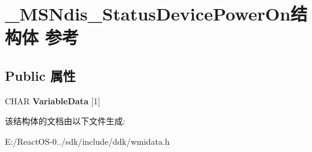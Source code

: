 \hypertarget{struct___m_s_ndis___status_device_power_on}{}\section{\+\_\+\+M\+S\+Ndis\+\_\+\+Status\+Device\+Power\+On结构体 参考}
\label{struct___m_s_ndis___status_device_power_on}
\subsection*{Public 属性}
\begin{DoxyCompactItemize}
\item 
\mbox{\label{struct___m_s_ndis___status_device_power_on_af2608f749601b7e739a8a095b9045ad2}} 
C\+H\+AR {\bfseries Variable\+Data} \mbox{[}1\mbox{]}
\end{DoxyCompactItemize}


该结构体的文档由以下文件生成\+:\begin{DoxyCompactItemize}
\item 
E\+:/\+React\+O\+S-\/0../sdk/include/ddk/wmidata.\+h\end{DoxyCompactItemize}
